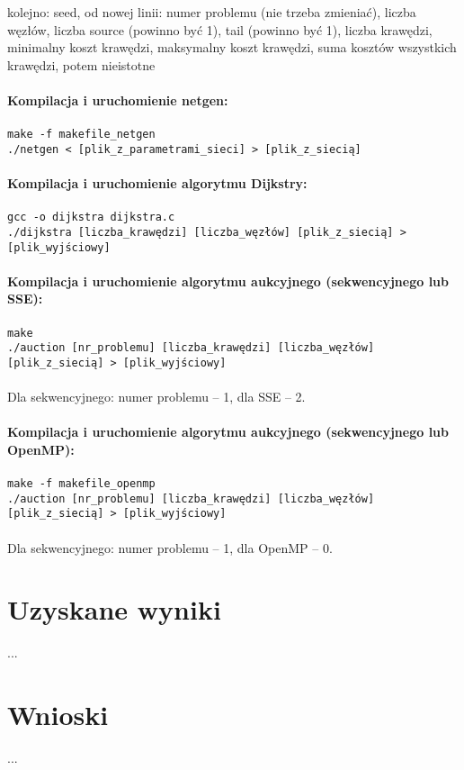 \documentclass[12pt,a4paper]{article}
\begin{document}
kolejno: seed, od nowej linii: numer problemu (nie trzeba zmieniać), liczba węzłów, liczba source (powinno być 1), tail (powinno być 1), liczba krawędzi, minimalny koszt krawędzi, maksymalny koszt krawędzi, suma kosztów wszystkich krawędzi, potem nieistotne\\\\
\textbf{Kompilacja i uruchomienie netgen:}\\\\
\texttt{make -f makefile\_netgen\\
./netgen < [plik\_z\_parametrami\_sieci] > [plik\_z\_siecią]}\\\\
\textbf{Kompilacja i uruchomienie algorytmu Dijkstry:}\\\\
\texttt{gcc -o dijkstra dijkstra.c\\
./dijkstra [liczba\_krawędzi] [liczba\_węzłów] [plik\_z\_siecią] > [plik\_wyjściowy]}\\\\
\textbf{Kompilacja i uruchomienie algorytmu aukcyjnego (sekwencyjnego lub SSE):}\\\\
\texttt{make\\
./auction [nr\_problemu] [liczba\_krawędzi] [liczba\_węzłów] [plik\_z\_siecią] > [plik\_wyjściowy]\\\\}
Dla sekwencyjnego: numer problemu -- 1, dla SSE -- 2.\\\\
\textbf{Kompilacja i uruchomienie algorytmu aukcyjnego (sekwencyjnego lub OpenMP):}\\\\
\texttt{make -f makefile\_openmp\\
./auction [nr\_problemu] [liczba\_krawędzi] [liczba\_węzłów] [plik\_z\_siecią] > [plik\_wyjściowy]\\\\}
Dla sekwencyjnego: numer problemu -- 1, dla OpenMP -- 0.
\section{Uzyskane wyniki}
...
\section{Wnioski}
...
\end{document}
